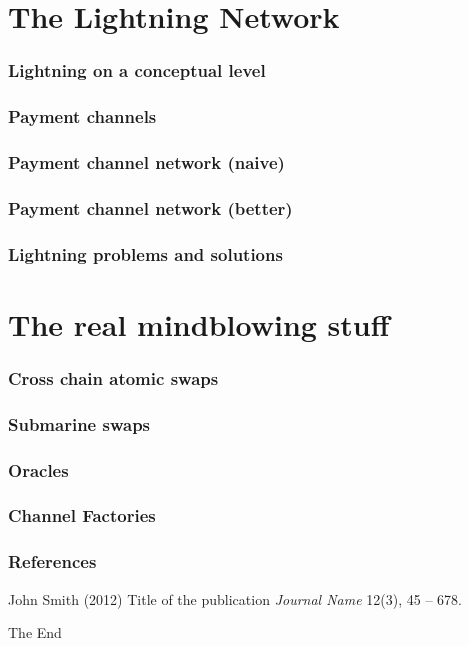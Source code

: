 \documentclass{beamer}
\begin{document}
\section{The Lightning Network}
\begin{frame}
\frametitle{Lightning on a conceptual level}

\end{frame}
\begin{frame}
\frametitle{Payment channels}

\end{frame}
\begin{frame}
\frametitle{Payment channel network (naive)}

\end{frame}
\begin{frame}
\frametitle{Payment channel network (better)}

\end{frame}

\begin{frame}
\frametitle{Lightning problems and solutions}

\end{frame}
\section{The real mindblowing stuff}
\begin{frame}
\frametitle{Cross chain atomic swaps}

\end{frame}
\begin{frame}
\frametitle{Submarine swaps}

\end{frame}

\begin{frame}
\frametitle{Oracles}

\end{frame}
\begin{frame}
\frametitle{Channel Factories}

\end{frame}

\begin{frame}
\frametitle{References}
\footnotesize{
\begin{thebibliography}{99} %
 John Smith (2012)
\newblock Title of the publication
\newblock \emph{Journal Name} 12(3), 45 -- 678.
\end{thebibliography}
}
\end{frame}


\begin{frame}
\Huge{\centerline{The End}}
\end{frame}

\end{document}
